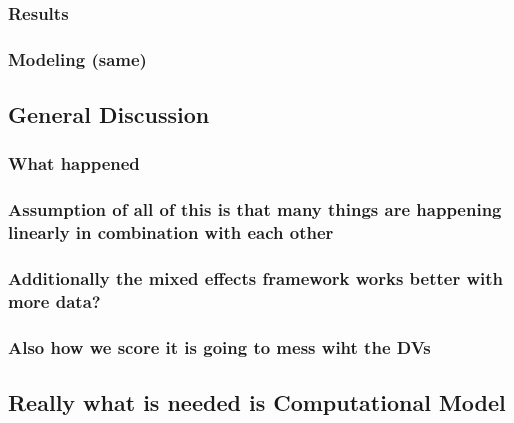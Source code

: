 \documentclass[]{book}
\begin{document}
\hypertarget{results-2}{%
\subsubsection{Results}\label{results-2}}

\hypertarget{modeling-same}{%
\subsubsection{Modeling (same)}\label{modeling-same}}

\hypertarget{general-discussion}{%
\subsection{General Discussion}\label{general-discussion}}

\hypertarget{what-happened}{%
\subsubsection{What happened}\label{what-happened}}

\hypertarget{assumption-of-all-of-this-is-that-many-things-are-happening-linearly-in-combination-with-each-other}{%
\subsubsection{Assumption of all of this is that many things are happening linearly in combination with each other}\label{assumption-of-all-of-this-is-that-many-things-are-happening-linearly-in-combination-with-each-other}}

\hypertarget{additionally-the-mixed-effects-framework-works-better-with-more-data}{%
\subsubsection{Additionally the mixed effects framework works better with more data?}\label{additionally-the-mixed-effects-framework-works-better-with-more-data}}

\hypertarget{also-how-we-score-it-is-going-to-mess-wiht-the-dvs}{%
\subsubsection{Also how we score it is going to mess wiht the DVs}\label{also-how-we-score-it-is-going-to-mess-wiht-the-dvs}}

\hypertarget{really-what-is-needed-is-computational-model}{%
\subsection{Really what is needed is Computational Model}\label{really-what-is-needed-is-computational-model}}
\end{document}
